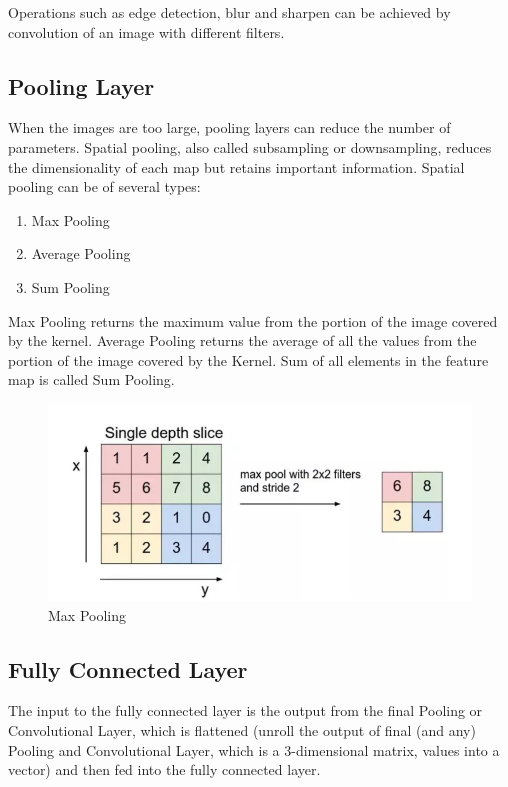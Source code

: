 Operations such as edge detection, blur and sharpen can be achieved by convolution of an image with different filters.


\subsection{Pooling Layer}
When the images are too large, pooling layers can reduce the number of parameters. Spatial pooling, also called subsampling or downsampling, reduces the dimensionality of each map but retains important information. Spatial pooling can be of several types:
\begin{enumerate}
    \item Max Pooling
    \item Average Pooling
    \item Sum Pooling
\end{enumerate}
Max Pooling returns the maximum value from the portion of the image covered by the kernel. Average Pooling returns the average of all the values from the portion of the image covered by the Kernel. Sum of all elements in the feature map is called Sum Pooling.

\begin{figure}[H]
\centering
	\includegraphics[scale=1]{Chapter2/max_pooling.jpg}	
	\caption{Max Pooling}
	\label{fig:maxpool}
\end{figure}

\subsection{Fully Connected Layer}
The input to the fully connected layer is the output from the final Pooling or Convolutional Layer, which is flattened (unroll the output of final (and any) Pooling and Convolutional Layer, which is a 3-dimensional matrix, values into a vector) and then fed into the fully connected layer.

